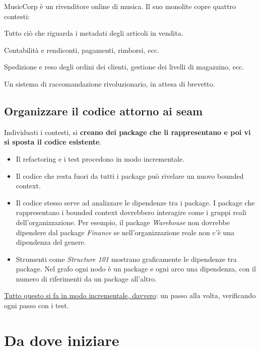 \begin{esempio}[MusicCorp]
MusicCorp è un rivenditore online di musica. Il suo monolite copre quattro contesti:
\begin{description}[leftmargin=0pt, style=unboxed]
  \item[Catalog.] Tutto ciò che riguarda i metadati degli articoli in vendita.
  \item[Finance.] Contabilità e rendiconti, pagamenti, rimborsi, ecc.
  \item[Warehouse.] Spedizione e reso degli ordini dei clienti, gestione dei livelli di magazzino, ecc.
  \item[Recommendation.] Un sistema di raccomandazione rivoluzionario, in attesa di brevetto.
\end{description}
\end{esempio}

\subsection{Organizzare il codice attorno ai seam}
\label{sec:split-package}

Individuati i contesti, si \textbf{creano dei package che li rappresentano e poi vi si sposta il codice esistente}.
\begin{itemize}
  \item Il refactoring e i test procedono in modo incrementale.
  \item Il codice che resta fuori da tutti i package può rivelare un nuovo bounded context.
  \item Il codice stesso serve ad analizzare le dipendenze tra i package. I package che rappresentano i bounded context
    dovrebbero interagire come i gruppi reali dell'organizzazione. Per esempio, il package \emph{Warehouse} non
    dovrebbe dipendere dal package \emph{Finance} se nell'organizzazione reale non c'è una dipendenza del genere.
  \item Strumenti come \emph{Structure 101} mostrano graficamente le dipendenze tra package. Nel grafo ogni nodo è un
    package e ogni arco una dipendenza, con il numero di riferimenti da un package all'altro.
\end{itemize}
\uline{Tutto questo si fa in modo incrementale, davvero}: un passo alla volta, verificando ogni passo con i test.

\section{Da dove iniziare}
\label{sec:split-inizio}

